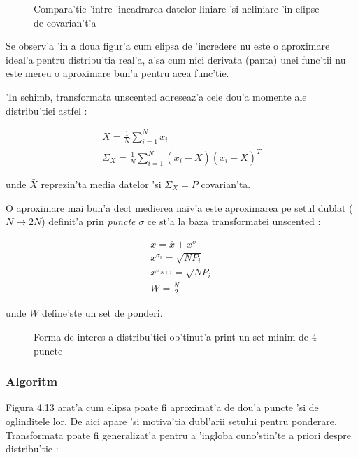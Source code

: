 \documentclass[12pt,a4paper,twoside]{report}
\begin{document}
\begin{figure}[h]
\centering

\caption{Compara'tie 'intre 'incadrarea datelor liniare 'si neliniare 'in elipse de covarian't'a}
\end{figure}

Se observ'a 'in a doua figur'a cum elipsa de 'incredere nu este o aproximare ideal'a pentru distribu'tia real'a, a'sa cum nici derivata (panta) unei func'tii nu este mereu o aproximare bun'a pentru acea func'tie.

\vspace{5px}

'In schimb, transformata unscented adreseaz'a cele dou'a momente ale distribu'tiei astfel \cite{1271397}:

\begin{gather}
\bar X = \frac{1}{N} \sum_{i=1}^{N} x_i \\
\Sigma_X = \frac{1}{N} \sum_{i=1}^{N} (x_i - \bar X)(x_i - \bar X)^T 
\end{gather}

unde $ \bar X $ reprezin'ta media datelor 'si $ \Sigma_X = P$ covarian'ta.

\vspace{5px}

O aproximare mai bun'a dec\ia t medierea naiv'a este aproximarea pe setul dublat ($N \to 2N$) definit'a prin \textit{puncte} $\sigma$ ce st'a la baza transformatei unscented \cite{1271397}:

\begin{gather}
    x = \bar x + x^{\sigma} \\
    x^{\sigma_i} = \sqrt{NP_i} \\ 
    x^{\sigma_{N+i}} = \sqrt{NP_i} \\
    W = \frac{N}{2}
\end{gather}

unde $W$ define'ste un set de ponderi.

\begin{figure}[h]
\centering

\caption{Forma de interes a distribu'tiei ob'tinut'a print-un set minim de 4 puncte}
\end{figure}

\subsubsection{Algoritm}

Figura 4.13 arat'a cum elipsa poate fi aproximat'a de dou'a puncte 'si de oglinditele lor. De aici apare 'si motiva'tia dubl'arii setului pentru ponderare. Transformata poate fi generalizat'a pentru a 'ingloba cuno'stin'te a priori despre distribu'tie \cite{882463}:
\end{document}
